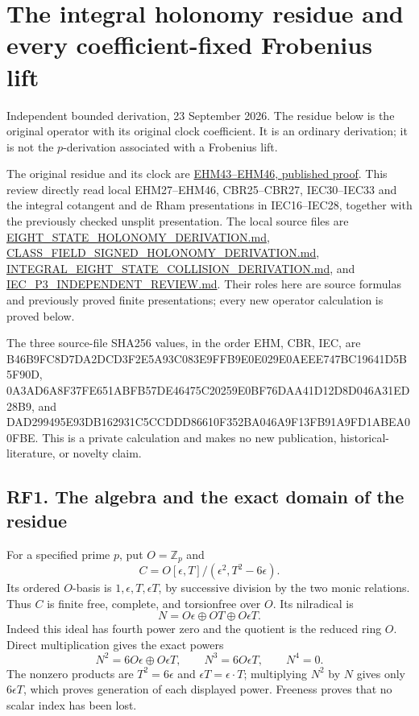 \documentclass[
  10pt,
]{article}
\author{}
\date{}
\begin{document}
\section{The integral holonomy residue and every coefficient-fixed
Frobenius
lift}\label{the-integral-holonomy-residue-and-every-coefficient-fixed-frobenius-lift}

Independent bounded derivation, 23 September 2026. The residue below is
the original operator with its original clock coefficient. It is an
ordinary derivation; it is not the \(p\)-derivation associated with a
Frobenius lift.

The original residue and its clock are
\href{https://github.com/KokunoYumeto/zeta-function-research-reader/blob/adfbfe74fa49e31cb7aa068cf755fb083be37c32/workbenches/splitzero-tandem/branches/tau-zero-prime-positivity/EIGHT_STATE_HOLONOMY_DERIVATION.md\#L371}{EHM43--EHM46,
published proof}. This review directly read local EHM27--EHM46,
CBR25--CBR27, IEC30--IEC33 and the integral cotangent and de Rham
presentations in IEC16--IEC28, together with the previously checked
unsplit presentation. The local source files are
\url{EIGHT_STATE_HOLONOMY_DERIVATION.md},
\url{CLASS_FIELD_SIGNED_HOLONOMY_DERIVATION.md},
\url{INTEGRAL_EIGHT_STATE_COLLISION_DERIVATION.md}, and
\url{IEC_P3_INDEPENDENT_REVIEW.md}. Their roles here are source formulas
and previously proved finite presentations; every new operator
calculation is proved below.

The three source-file SHA256 values, in the order EHM, CBR, IEC, are
B46B9FC8D7DA2DCD3F2E5A93C083E9FFB9E0E029E0AEEE747BC19641D5B5F90D,
0A3AD6A8F37FE651ABFB57DE46475C20259E0BF76DAA41D12D8D046A31ED28B9, and
DAD299495E93DB162931C5CCDDD86610F352BA046A9F13FB91A9FD1ABEA00FBE. This
is a private calculation and makes no new publication,
historical-literature, or novelty claim.

\subsection{RF1. The algebra and the exact domain of the
residue}\label{rf1.-the-algebra-and-the-exact-domain-of-the-residue}

For a specified prime \(p\), put \(O=\mathbb Z_p\) and \[
C=O[\epsilon,T]/(\epsilon^2,T^2-6\epsilon).
\tag{RF1}
\] Its ordered \(O\)-basis is \(1,\epsilon,T,\epsilon T\), by successive
division by the two monic relations. Thus \(C\) is finite free,
complete, and torsionfree over \(O\). Its nilradical is \[
N=O\epsilon\oplus OT\oplus O\epsilon T.
\] Indeed this ideal has fourth power zero and the quotient is the
reduced ring \(O\). Direct multiplication gives the exact powers \[
N^2=6O\epsilon\oplus O\epsilon T,\qquad
N^3=6O\epsilon T,\qquad N^4=0.
\tag{RF2}
\] The nonzero products are \(T^2=6\epsilon\) and
\(\epsilon T=\epsilon\cdot T\); multiplying \(N^2\) by \(N\) gives only
\(6\epsilon T\), which proves generation of each displayed power.
Freeness proves that no scalar index has been lost.
\end{document}
